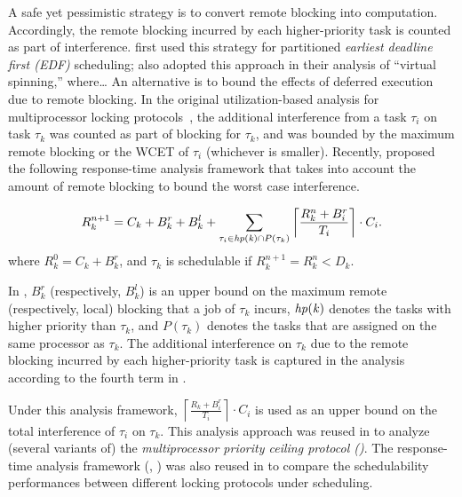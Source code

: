 A safe yet pessimistic strategy is to convert remote blocking into computation. Accordingly, the remote blocking incurred by each higher-priority task is counted as part of interference. \citet{block-2007} first used this strategy for partitioned \emph{earliest deadline first (EDF)} scheduling;  \citet{lakshmanan-2009} also adopted this approach in their analysis of ``virtual spinning,'' where\ldots{} An alternative is to bound the effects of deferred execution due to remote blocking. In the original utilization-based analysis for multiprocessor locking protocols~\cite{rajkumar-1990,RSL:88}, the additional interference from a task $\tau_i$ on task $\tau_k$ was counted as part of blocking for $\tau_k$, and was bounded by the maximum remote blocking or the WCET of $\tau_i$ (whichever is smaller). Recently, \citet{lakshmanan-2009} proposed the following response-time analysis framework that takes into account the amount of remote blocking to bound the worst case interference.

\begin{align}
\label{eq:wcrt}
R_k^{n+1} = C_k + B_k^r + B_k^l + \sum_{\tau_i \in \fun{hp(k)} \cap P(\tau_k)} \left \lceil \frac{R_k^n + B_i^r}{T_i} \right \rceil \cdot C_i.  
\end{align}
where $R_k^0 = C_k + B_k^r$, and $\tau_k$ is schedulable if $R_k^{n+1} = R_k^n < D_k$. 

In , $B_k^r$ (respectively, $B_k^l$) is an upper bound on the maximum remote (respectively, local) blocking that a job of $\tau_k$ incurs, $\mathit{hp(k)}$ denotes the tasks with higher priority than $\tau_k$, and $P(\tau_k)$ denotes the tasks that are assigned on the same processor as $\tau_k$. The additional interference on $\tau_k$ due to the remote blocking incurred by each higher-priority task is captured in the analysis according to the fourth term in .

Under this analysis framework, $\left \lceil \frac{R_k + B_i^r}{T_i} \right \rceil \cdot C_i$ is used as an upper bound on the total interference of $\tau_i$ on $\tau_k$. This analysis approach was reused in \cite{yang-2013,kim-2014,carminati-2014,yang-2014} to analyze (several variants of) the \emph{multiprocessor priority ceiling protocol (\mpcp)}. The response-time analysis framework (\ie, ) was also reused in \cite{zeng-2011,bbb-2013,han-2014} to compare the schedulability performances between different locking protocols under \pfp scheduling. 

